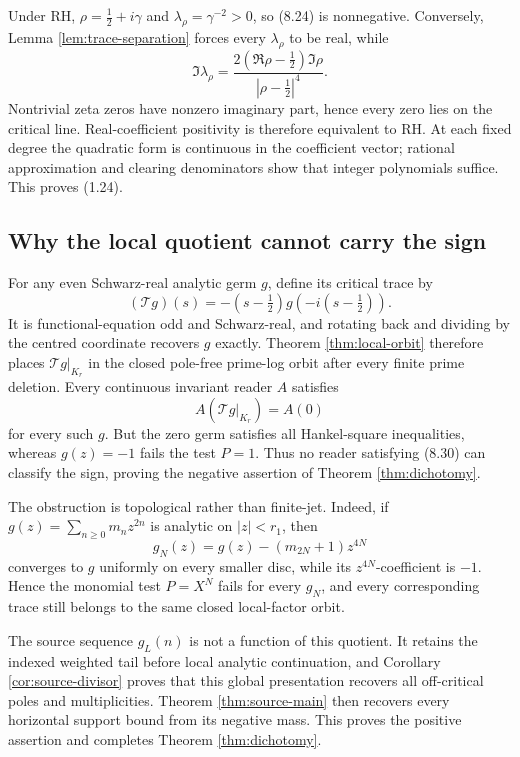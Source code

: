 \documentclass[11pt]{article}
\begin{document}
Under RH, \(\rho=\frac12+i\gamma\) and
\(\lambda_\rho=\gamma^{-2}>0\), so (8.24) is nonnegative.  Conversely, Lemma
\ref{lem:trace-separation} forces every \(\lambda_\rho\) to be real, while
\[
 \Im\lambda_\rho=
 \frac{2(\Re\rho-\frac12)\Im\rho}
 {|\rho-\frac12|^4}.
\tag{8.28}
\]
Nontrivial zeta zeros have nonzero imaginary part, hence every zero lies on the critical line.
Real-coefficient positivity is therefore equivalent to RH.  At each fixed degree the quadratic
form is continuous in the coefficient vector; rational approximation and clearing denominators
show that integer polynomials suffice.  This proves (1.24).

\subsection{Why the local quotient cannot carry the sign}

For any even Schwarz-real analytic germ \(g\), define its critical trace by
\[
 (\mathcal Tg)(s)=
 -(s-\tfrac12)g\!\left(-i(s-\tfrac12)\right).
\tag{8.29}
\]
It is functional-equation odd and Schwarz-real, and rotating back and dividing by the centred
coordinate recovers \(g\) exactly.  Theorem \ref{thm:local-orbit} therefore places
\(\mathcal Tg|_{K_r}\) in the closed pole-free prime-log orbit after every finite prime deletion.
Every continuous invariant reader \(A\) satisfies
\[
 A(\mathcal Tg|_{K_r})=A(0)
\tag{8.30}
\]
for every such \(g\).  But the zero germ satisfies all Hankel-square inequalities, whereas
\(g(z)=-1\) fails the test \(P=1\).  Thus no reader satisfying (8.30) can classify the sign,
proving the negative assertion of Theorem \ref{thm:dichotomy}.

The obstruction is topological rather than finite-jet.  Indeed, if
\(g(z)=\sum_{n\ge0}m_nz^{2n}\) is analytic on \(|z|<r_1\), then
\[
 g_N(z)=g(z)-(m_{2N}+1)z^{4N}
\tag{8.31}
\]
converges to \(g\) uniformly on every smaller disc, while its
\(z^{4N}\)-coefficient is \(-1\).  Hence the monomial test \(P=X^N\) fails for every
\(g_N\), and every corresponding trace still belongs to the same closed local-factor orbit.

The source sequence \(g_L(n)\) is not a function of this quotient.  It retains the indexed
weighted tail before local analytic continuation, and Corollary \ref{cor:source-divisor} proves
that this global presentation recovers all off-critical poles and multiplicities.  Theorem
\ref{thm:source-main} then recovers every horizontal support bound from its negative mass.
This proves the positive assertion and completes Theorem \ref{thm:dichotomy}.
\end{document}
